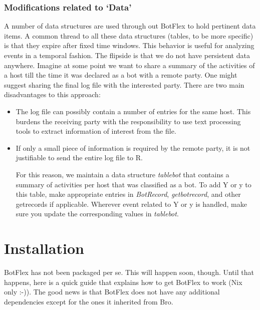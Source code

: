 \documentclass[acmtocl]{acmtrans2m}
\begin{document}
\subsubsection{Modifications related to `Data'}
A number of data structures are used through out BotFlex
to hold pertinent data items. A common thread to all these
data structures (tables, to be more specific) is that they
expire after fixed time windows. This behavior is useful for
analyzing events in a temporal fashion. The flipside is that
we do not have persistent data anywhere. Imagine at some point
we want to share a summary of the activities of a host till the 
time it was declared as a bot with a remote party. One might 
suggest sharing the final log file with the interested party.
There are two main disadvantages to this approach:
\begin{itemize}
\item The log file can possibly contain a number of entries
for the same host. This burdens the receiving party with
the responsibility to use text processing tools to extract 
information of interest from the file.
\item If only a small piece of information is required by the 
remote party, it is not justifiable to send the entire log file
to R. 
  
For this reason, we maintain a data structure \textit{table\textunderscore bot}
that contains a summary of activities per host that was classified
as a bot. To add Y or y to this table, make appropriate entries in
\textit{BotRecord}, \textit{get\textunderscore bot\textunderscore record}, 
and other get\textunderscore * records if 
applicable. Wherever event related to Y or y is handled, make sure 
you update the corresponding values in \textit{table\textunderscore bot}.
\end{itemize}
      
\section{Installation}
BotFlex has not been packaged per se. 
This will happen soon, though. 
Until that happens, here is a quick guide that explains 
how to get BotFlex to work (Nix only :-)). 
The good news is that BotFlex does not have any
additional dependencies except for the ones it 
inherited from Bro. 
\end{document}
